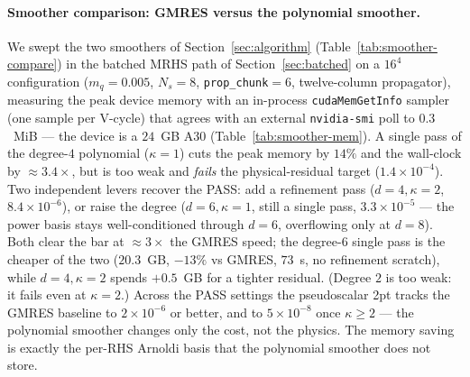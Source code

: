\documentclass[12pt,a4paper]{article}
\begin{document}
\paragraph{Smoother comparison: GMRES versus the polynomial smoother.}
We swept the two smoothers of Section~\ref{sec:algorithm}
(Table~\ref{tab:smoother-compare}) in the batched MRHS path of
Section~\ref{sec:batched} on a $16^4$ configuration ($m_q=0.005$, $N_s=8$,
\texttt{prop\_chunk}$=6$, twelve-column propagator), measuring the peak device
memory with an in-process \texttt{cudaMemGetInfo} sampler (one sample per V-cycle)
that agrees with an external \texttt{nvidia-smi} poll to $0.3$~MiB --- the device
is a $24$~GB A30 (Table~\ref{tab:smoother-mem}). A single pass of the degree-$4$
polynomial ($\kappa{=}1$) cuts the peak memory by $14\%$ and the wall-clock by
${\approx}3.4\times$, but is too weak and \emph{fails} the physical-residual target
($1.4\times10^{-4}$). Two independent levers recover the PASS: add a refinement
pass ($d{=}4,\kappa{=}2$, $8.4\times10^{-6}$), or raise the degree
($d{=}6,\kappa{=}1$, still a single pass, $3.3\times10^{-5}$ --- the power basis
stays well-conditioned through $d=6$, overflowing only at $d=8$). Both clear the
bar at ${\approx}3\times$ the GMRES speed; the degree-$6$ single pass is the
cheaper of the two ($20.3$~GB, $-13\%$ vs GMRES, $73$~s, no refinement scratch),
while $d{=}4,\kappa{=}2$ spends $+0.5$~GB for a tighter residual. (Degree $2$ is
too weak: it fails even at $\kappa{=}2$.) Across the PASS settings the pseudoscalar
2pt tracks the GMRES baseline to $2\times10^{-6}$ or better, and to
$5\times10^{-8}$ once $\kappa{\ge}2$ --- the polynomial smoother changes only the
cost, not the physics. The memory saving is exactly the per-RHS Arnoldi basis that
the polynomial smoother does not store.
\end{document}
